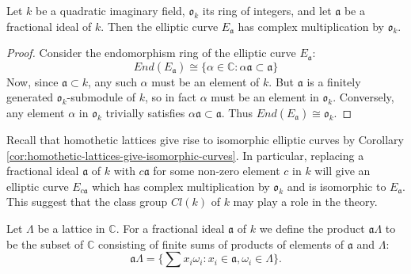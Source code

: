 \begin{thm}
  \label{thm:cm-curves-from-frac-ideals}
  Let $k$ be a quadratic imaginary field, $\mathfrak{o}_{k}$ its ring of integers,
  and let $\mathfrak{a}$ be a fractional ideal of $k$.  Then the elliptic curve
  $E_{\mathfrak{a}}$ has complex multiplication by $\mathfrak{o}_{k}$.
\end{thm}
\begin{proof}
  Consider the endomorphism ring of the elliptic curve $E_{\mathfrak{a}}$:
  \begin{equation*}
    End(E_{\mathfrak{a}}) \cong \{ \alpha \in \mathbb{C} \colon \alpha\mathfrak{a}
    \subset \mathfrak{a}\}
  \end{equation*}
  Now, since $\mathfrak{a} \subset k$, any such $\alpha$ must be an element of $k$.
  But $\mathfrak{a}$ is a finitely generated $\mathfrak{o}_{k}$-submodule of $k$, so
  in fact $\alpha$ must be an element in $\mathfrak{o}_{k}$.  Conversely, any element
  $\alpha$ in $\mathfrak{o}_{k}$ trivially satisfies $\alpha\mathfrak{a} \subset
  \mathfrak{a}$.  Thus $End(E_{\mathfrak{a}}) \cong \mathfrak{o}_{k}$.
\end{proof}
Recall that homothetic lattices give rise to isomorphic elliptic curves by Corollary
\ref{cor:homothetic-lattices-give-isomorphic-curves}.  In particular, replacing a
fractional ideal $\mathfrak{a}$ of $k$ with $c\mathfrak{a}$ for some non-zero element
$c$ in $k$ will give an elliptic curve $E_{c\mathfrak{a}}$ which has complex
multiplication by $\mathfrak{o}_{k}$ and is isomorphic to $E_{\mathfrak{a}}$.  This
suggest that the class group $Cl(k)$ of $k$ may play a role in the theory.

Let $\Lambda$ be a lattice in $\mathbb{C}$.  For a fractional ideal $\mathfrak{a}$ of
$k$ we define the product $\mathfrak{a}\Lambda$ to be the subset of $\mathbb{C}$
consisting of finite sums of products of elements of $\mathfrak{a}$ and $\Lambda$:
\begin{equation*}
  \mathfrak{a}\Lambda = \{ \sum x_{i}\omega_{i} \colon x_{i} \in \mathfrak{a},
  \omega_{i} \in \Lambda\}.
\end{equation*}

